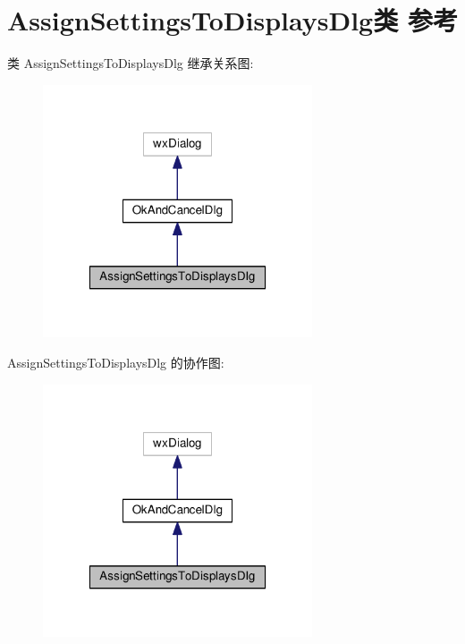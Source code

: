 \hypertarget{class_assign_settings_to_displays_dlg}{\section{Assign\+Settings\+To\+Displays\+Dlg类 参考}
\label{class_assign_settings_to_displays_dlg}
}


类 Assign\+Settings\+To\+Displays\+Dlg 继承关系图\+:
\nopagebreak
\begin{figure}[H]
\begin{center}
\leavevmode
\includegraphics[width=226pt]{class_assign_settings_to_displays_dlg__inherit__graph}
\end{center}
\end{figure}


Assign\+Settings\+To\+Displays\+Dlg 的协作图\+:
\nopagebreak
\begin{figure}[H]
\begin{center}
\leavevmode
\includegraphics[width=226pt]{class_assign_settings_to_displays_dlg__coll__graph}
\end{center}
\end{figure}
